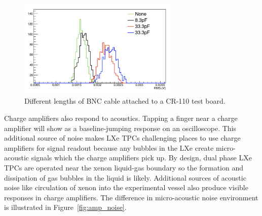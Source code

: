 \begin{figure}[htbp]
\begin{center}
\includegraphics[width=3in]{figures/testbed/rms.png}
\caption{Different lengths of BNC cable attached to a CR-110 test board.}
\label{fig:rms}
\end{center}
\end{figure}

Charge amplifiers also respond to acoustics. Tapping a finger near a charge amplifier will show as a baseline-jumping response on an oscilloscope. This additional source of noise makes \ac{LXe} \ac{TPC}s challenging places to use charge amplifiers for signal readout because any bubbles in the \ac{LXe} create micro-acoustic signals which the charge amplifiers pick up. By design, dual phase \ac{LXe} \ac{TPC}s are operated near the xenon liquid-gas boundary so the formation and dissipation of gas bubbles in the liquid is likely. Additional sources of acoustic noise like circulation of xenon into the experimental vessel also produce visible responses in charge amplifiers. The difference in micro-acoustic noise environment is illustrated in Figure~\ref{fig:amp_noise}.


